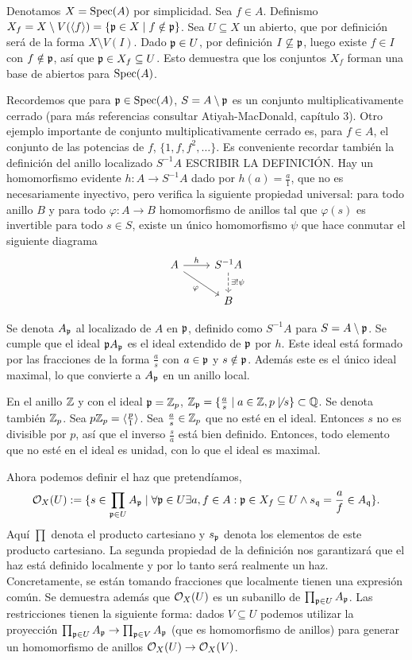 \documentclass[GA.tex]{subfiles}
\begin{document}
Denotamos $X=\operatorname{Spec}(A)$ por simplicidad. Sea $f\in A$. Definismo $X_f=X\setminus V(\langle{f}\rangle)=\{{\mathfrak{p}}\in X\mid f\notin{\mathfrak{p}}\}$. Sea $U\subseteq X$ un abierto, que por definición será de la forma $X\setminus V(I)$. Dado ${\mathfrak{p}}\in U$, por definición $I\not\subseteq{\mathfrak{p}}$, luego existe $f\in I$ con $f\notin{\mathfrak{p}}$, así que ${\mathfrak{p}}\in X_f\subseteq U$. Esto demuestra que los conjuntos $X_f$ forman una base de abiertos para $\operatorname{Spec}(A)$. 

Recordemos que para ${\mathfrak{p}}\in\operatorname{Spec}(A)$, $S=A\setminus{\mathfrak{p}}$ es un conjunto multiplicativamente cerrado (para más referencias consultar Atiyah-MacDonald, capítulo 3). Otro ejemplo importante de conjunto multiplicativamente cerrado es, para $f\in A$, el conjunto de las potencias de $f$, $\{1,f,f^2,\dots\}$. Es conveniente recordar también la definición del anillo localizado $S^{-1}A$ ESCRIBIR LA DEFINICIÓN. Hay un homomorfismo evidente $h:A\to S^{-1}A$ dado por $h(a)=\frac{a}{1}$, que no es necesariamente inyectivo, pero verifica la siguiente propiedad universal: para todo anillo $B$ y para todo $\varphi:A\to B$ homomorfismo de anillos tal que $\varphi(s)$ es invertible para todo $s\in S$, existe un único homomorfismo $\psi$ que hace conmutar el siguiente diagrama
\[
\begin{tikzcd}
A\arrow[r, "h"]\arrow[dr, "\varphi"'] & S^{-1}A\arrow[d, dashed, "\exists!\psi"]\\
& B
\end{tikzcd}
\]

Se denota $A_{\mathfrak{p}}$ al localizado de $A$ en ${\mathfrak{p}}$, definido como $S^{-1}A$ para $S=A\setminus{\mathfrak{p}}$. Se cumple que el ideal ${\mathfrak{p}} A_{\mathfrak{p}}$ es el ideal extendido de ${\mathfrak{p}}$ por $h$. Este ideal está formado por las fracciones de la forma $\frac{a}{s}$ con $a\in{\mathfrak{p}}$ y $s\notin{\mathfrak{p}}$. Además este es el único ideal maximal, lo que convierte a $A_{\mathfrak{p}}$ en un anillo local. 

\begin{ej}
En el anillo $\mathbb{Z}$ y con el ideal ${\mathfrak{p}}=\mathbb{Z}_p$, $\mathbb{Z}_{\mathfrak{p}}=\{\frac{a}{s}\mid a\in\mathbb{Z}, p\not\mid s\}\subset\mathbb{Q}$. Se denota también $\mathbb{Z}_p$. Sea $p\mathbb{Z}_p=\langle{\frac{p}{1}}\rangle$. Sea $\frac{a}{s}\in\mathbb{Z}_p$ que no esté en el ideal. Entonces $s$ no es divisible por $p$, así que el inverso $\frac{s}{a}$ está bien definido. Entonces, todo elemento que no esté en el ideal es unidad, con lo que el ideal es maximal. 
\end{ej}

Ahora podemos definir el haz que pretendíamos, $${\mathcal O}_X(U):=\{s\in\prod_{{\mathfrak{p}}\in U}A_{\mathfrak{p}}\mid\forall{\mathfrak{p}}\in U\exists a,f\in A: {\mathfrak{p}}\in X_f\subseteq U\land s_{\mathfrak{q}}=\frac{a}{f}\in A_{\mathfrak{q}} \}.$$ Aquí $\prod$ denota el producto cartesiano y $s_{\mathfrak{p}}$ denota los elementos de este producto cartesiano. La segunda propiedad de la definición nos garantizará que el haz está definido localmente y por lo tanto será realmente un haz. Concretamente, se están tomando fracciones que localmente tienen una expresión común. Se demuestra además que ${\mathcal O}_X(U)$ es un subanillo de $\prod_{{\mathfrak{p}}\in U}A_{\mathfrak{p}}$. Las restricciones tienen la siguiente forma: dados $V\subseteq U$ podemos utilizar la proyección $\prod_{{\mathfrak{p}}\in U}A_{\mathfrak{p}}\to\prod_{{\mathfrak{p}}\in V}A_{\mathfrak{p}}$ (que es homomorfismo de anillos) para generar un homomorfismo de anillos ${\mathcal O}_X(U)\to{\mathcal O}_X(V)$. 
\end{document}
